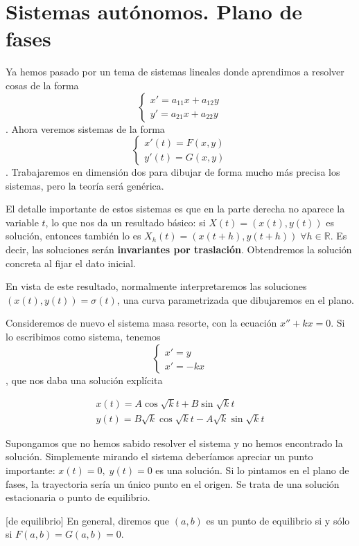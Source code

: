 \section{Sistemas autónomos. Plano de fases}

Ya hemos pasado por un tema de sistemas lineales donde aprendimos a resolver cosas de la forma \[ \begin{cases}x'= a_{11}x + a_{12}y \\ y'=a_{21}x + a_{22}y \end{cases} \]. Ahora veremos sistemas de la forma \[ \begin{cases} x'(t) = F(x,y) \\ y'(t) = G(x,y) \end{cases} \]. Trabajaremos en dimensión dos para dibujar de forma mucho más precisa los sistemas, pero la teoría será genérica.

El detalle importante de estos sistemas es que en la parte derecha no aparece la variable $t$, lo que nos da un resultado básico: si $X(t) = (x(t), y(t))$ es solución, entonces también lo es $X_h(t) = (x(t+h), y(t+h))\; ∀h∈ℝ$. Es decir, las soluciones serán \textbf{invariantes por traslación}. Obtendremos la solución concreta al fijar el dato inicial.

En vista de este resultado, normalmente interpretaremos las soluciones $(x(t), y(t)) = σ(t)$, una curva parametrizada que dibujaremos en el plano.

Consideremos de nuevo el sistema masa resorte, con la ecuación $x'' +kx = 0$. Si lo escribimos como sistema, tenemos \[ \begin{cases} x' = y \\ x' = -kx \end{cases} \], que nos daba una solución explícita 

\begin{align*}
x(t) = A\cos \sqrt{k}t + B \sin \sqrt{k} t \\
y(t) = B\sqrt{k}\cos \sqrt{k} t - A \sqrt{k}\sin \sqrt{k} t
\end{align*}

Supongamos que no hemos sabido resolver el sistema y no hemos encontrado la solución. Simplemente mirando el sistema deberíamos apreciar un punto importante: $x(t) = 0,\;y(t) = 0$ es una solución. Si lo pintamos en el plano de fases, la trayectoria sería un único punto en el origen. Se trata de una solución estacionaria o punto de equilibrio.

\begin{definition}[de equilibrio]
En general, diremos que $(a,b)$ es un punto de equilibrio si y sólo si $F(a,b) = G(a,b) = 0$.
\end{definition}

